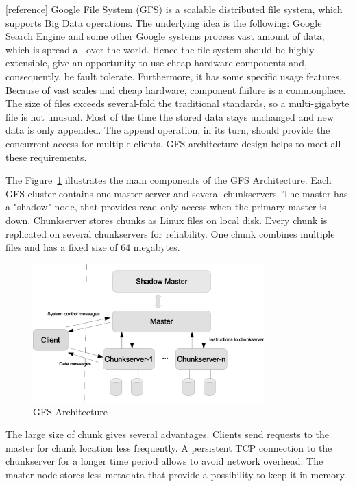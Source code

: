 [reference]
Google File System (GFS) is a scalable distributed file system, which supports Big Data operations.
The underlying idea is the following: Google Search Engine and some other Google systems process vast amount of data, which is spread all over the world.
Hence the file system should be highly extensible, give an opportunity to use cheap hardware components and, consequently, be fault tolerate. 
Furthermore, it has some specific usage features.
Because of vast scales and cheap hardware, component failure is a commonplace.
The size of files exceeds several-fold the traditional standards, so a multi-gigabyte file is not unusual.
Most of the time the stored data stays unchanged and new data is only appended.
The append operation, in its turn, should provide the concurrent access for multiple clients.
GFS architecture design helps to meet all these requirements.

The Figure~\ref{fig:GFS_architecture} illustrates the main components of the GFS
Architecture.
Each GFS cluster contains one master server and several chunkservers.
The master has a "shadow" node, that provides read-only access when the primary master is down. 
Chunkserver stores chunks as Linux files on local disk.
Every chunk is replicated on several chunkservers for reliability.
One chunk combines multiple files and has a fixed size of 64 megabytes.

\begin{figure}
  \centering
  \includegraphics [width=0.8\textwidth]{images/GFS_architecture}
  \caption{GFS Architecture}
  \label{fig:GFS_architecture}
\end{figure}

The large size of chunk gives several advantages.
Clients send requests to the master for chunk location less frequently.
A persistent TCP connection to the chunkserver for a longer time period allows to avoid network overhead.
The master node stores less metadata that provide a possibility to keep it in memory.

